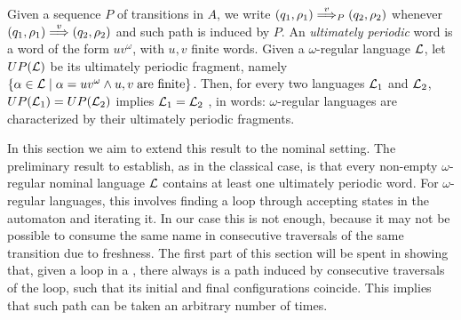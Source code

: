 %
%
{
Given a sequence $P$ of transitions in $A$, we write $(q_1,\rho_1) \overset{v}{\Longrightarrow}_{P} (q_2,\rho_2)$ whenever $(q_1,\rho_1) \overset{v}{\Longrightarrow} (q_2,\rho_2)$ and such path is induced by $P$.
}
%
An \emph{ultimately periodic} word is a word of the form $uv^\omega$, with $u,v$ finite words. Given a $\omega$-regular language $\mathcal{L}$, let $UP(\mathcal{L})$ be its ultimately periodic fragment, namely $\{ \alpha \in \mathcal{L} \mid \alpha = uv^\omega \land u,v \; \text{are finite} \}$. Then, for every two languages $\mathcal{L}_1$ and $\mathcal{L}_2$, $UP(\mathcal{L}_1) = UP(\mathcal{L}_2)$ implies $\mathcal{L}_1 = \mathcal{L}_2$ \cite{CalbrixNP93}, in words: $\omega$-regular languages are characterized by their ultimately periodic fragments.

In this section we aim to extend this result to the nominal setting. The preliminary result to establish, as in the classical case, is that every non-empty $\omega$-regular nominal language $\mathcal{L}$ contains at least one ultimately periodic word. For $\omega$-regular languages, this involves finding a loop through accepting states in the automaton and iterating it. In our case this is not enough, because it may not be possible to consume the same name in consecutive traversals of the same transition due to freshness. The first part of this section will be spent in showing that, given a loop in a \hdma{}, there always is a path induced by consecutive traversals of the loop, such that its initial and final configurations coincide. This implies that such path can be taken an arbitrary number of times.

